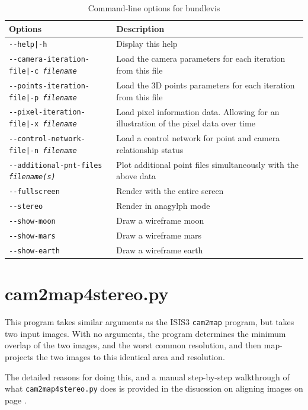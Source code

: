 \begin{longtable}{|l|p{10cm}|}
\caption{Command-line options for bundlevis}
\label{tbl:bundlevis}
\endfirsthead
\endhead
\endfoot
\endlastfoot
\hline
Options & Description \\ \hline \hline
\texttt{-\/-help|-h} & Display this help \\ \hline
\texttt{-\/-camera-iteration-file|-c \textit{filename}} & Load the camera parameters for each iteration from this file \\ \hline
\texttt{-\/-points-iteration-file|-p \textit{filename}} & Load the 3D points parameters for each iteration from this file \\ \hline
\texttt{-\/-pixel-iteration-file|-x \textit{filename}} & Load pixel information data. Allowing for an illustration of the pixel data over time \\ \hline
\texttt{-\/-control-network-file|-n \textit{filename}} & Load a control network for point and camera relationship status \\ \hline
\texttt{-\/-additional-pnt-files \textit{filename(s)}} & Plot additional point files simultaneously with the above data \\ \hline
\texttt{-\/-fullscreen} & Render with the entire screen \\ \hline
\texttt{-\/-stereo} & Render in anagylph mode \\ \hline
\texttt{-\/-show-moon} & Draw a wireframe moon \\ \hline
\texttt{-\/-show-mars} & Draw a wireframe mars \\ \hline
\texttt{-\/-show-earth} & Draw a wireframe earth \\ \hline
\end{longtable}

\clearpage

\section{cam2map4stereo.py}
\label{cam2map4stereo}

This program takes similar arguments as the ISIS3 \texttt{cam2map} program,
but takes two input images.  With no arguments, the program determines
the minimum overlap of the two images, and the worst common resolution,
and then map-projects the two images to this identical area and resolution.

The detailed reasons for doing this, and a manual step-by-step walkthrough of
what \texttt{cam2map4stereo.py} does is provided in the disucssion on aligning images on page \pageref{sec:AligningImages}.

